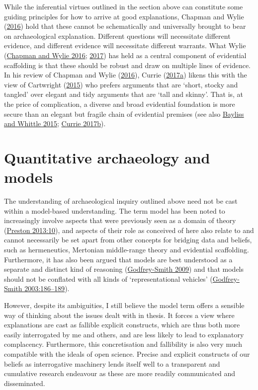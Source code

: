 \documentclass[
  12pt,
  a4paper,
  oneside]{book}
\begin{document}
While the inferential virtues outlined in the section above can constitute some guiding principles for how to arrive at good explanations, Chapman and Wylie (\protect\hyperlink{ref-chapman2016}{2016}) hold that these cannot be schematically and universally brought to bear on archaeological explanation. Different questions will necessitate different evidence, and different evidence will necessitate different warrants. What Wylie (\protect\hyperlink{ref-chapman2016}{Chapman and Wylie 2016}; \protect\hyperlink{ref-wylie2017}{2017}) has held as a central component of evidential scaffolding is that these should be robust and draw on multiple lines of evidence. In his review of Chapman and Wylie (\protect\hyperlink{ref-chapman2016}{2016}), Currie (\protect\hyperlink{ref-currie2017}{2017a}) likens this with the view of Cartwright (\protect\hyperlink{ref-cartwright2015}{2015}) who prefers arguments that are `short, stocky and tangled' over elegant and tidy arguments that are `tall and skinny'. That is, at the price of complication, a diverse and broad evidential foundation is more secure than an elegant but fragile chain of evidential premises (see also \protect\hyperlink{ref-bayliss2015}{Bayliss and Whittle 2015}; \protect\hyperlink{ref-currie2017a}{Currie 2017b}).

\hypertarget{quantitative-archaeology-and-models}{%
\section{Quantitative archaeology and models}\label{quantitative-archaeology-and-models}}

The understanding of archaeological inquiry outlined above need not be cast within a model-based understanding. The term model has been noted to increasingly involve aspects that were previously seen as a domain of theory (\protect\hyperlink{ref-preston2013}{Preston 2013:10}), and aspects of their role as conceived of here also relate to and cannot necessarily be set apart from other concepts for bridging data and beliefs, such as hermeneutics, Mertonian middle-range theory and evidential scaffolding. Furthermore, it has also been argued that models are best understood as a separate and distinct kind of reasoning (\protect\hyperlink{ref-godfrey-smith2009}{Godfrey-Smith 2009}) and that models should not be conflated with all kinds of `representational vehicles' (\protect\hyperlink{ref-godfrey-smith2003}{Godfrey-Smith 2003:186--189}).

However, despite its ambiguities, I still believe the model term offers a sensible way of thinking about the issues dealt with in thesis. It forces a view where explanations are cast as fallible explicit constructs, which are thus both more easily interrogated by me and others, and are less likely to lead to explanatory complacency. Furthermore, this concretisation and fallibility is also very much compatible with the ideals of open science. Precise and explicit constructs of our beliefs as interrogative machinery lends itself well to a transparent and cumulative research endeavour as these are more readily communicated and disseminated.
\end{document}

